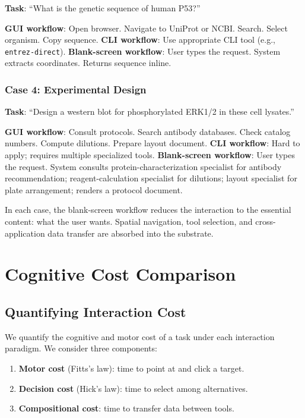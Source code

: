 \documentclass[11pt,twocolumn,a4paper]{article}
\theoremstyle{definition}
\theoremstyle{remark}
\begin{document}
\textbf{Task}: ``What is the genetic sequence of human P53?''

\textbf{GUI workflow}: Open browser. Navigate to UniProt or NCBI. Search. Select organism. Copy sequence.
\textbf{CLI workflow}: Use appropriate CLI tool (e.g., \texttt{entrez-direct}).
\textbf{Blank-screen workflow}: User types the request. System extracts coordinates. Returns sequence inline.

\subsubsection{Case 4: Experimental Design}

\textbf{Task}: ``Design a western blot for phosphorylated ERK1/2 in these cell lysates.''

\textbf{GUI workflow}: Consult protocols. Search antibody databases. Check catalog numbers. Compute dilutions. Prepare layout document.
\textbf{CLI workflow}: Hard to apply; requires multiple specialized tools.
\textbf{Blank-screen workflow}: User types the request. System consults protein-characterization specialist for antibody recommendation; reagent-calculation specialist for dilutions; layout specialist for plate arrangement; renders a protocol document.

In each case, the blank-screen workflow reduces the interaction to the essential content: what the user wants. Spatial navigation, tool selection, and cross-application data transfer are absorbed into the substrate.

\section{Cognitive Cost Comparison}
\label{sec:cognitive}

\subsection{Quantifying Interaction Cost}

We quantify the cognitive and motor cost of a task under each interaction paradigm. We consider three components:
\begin{enumerate}
    \item \textbf{Motor cost} (Fitts's law): time to point at and click a target.
    \item \textbf{Decision cost} (Hick's law): time to select among alternatives.
    \item \textbf{Compositional cost}: time to transfer data between tools.
\end{enumerate}
\end{document}
